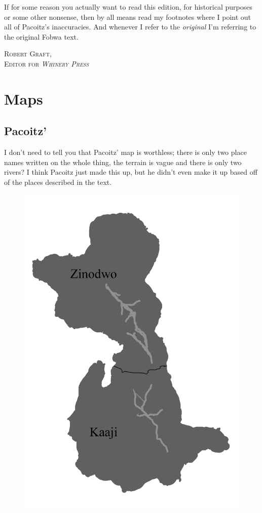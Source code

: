 If for some reason you actually want to read this edition, for historical purposes or some other nonsense, then by all means read my footnotes where I point out all of Pa\-co\-itz's inaccuracies. And whenever I refer to the \emph{original} I'm referring to the original Fo\-bwa text.
\begin{flushright}
\textsc{
Robert Graft,\\
Editor for \emph{Whinery Press}}
\end{flushright}

\chapter{Maps}
\section{Pa\-co\-itz'}
I don't need to tell you that Pa\-co\-itz' map is worthless; there is only two place names written on the whole thing, the terrain is vague and there is only two rivers? I think Pa\-co\-itz just made this up, but he didn't even make it up based off of the places described in the text.
\begin{figure}
\centering
\includegraphics[width=4.5in]{Twizwa_map2.png}
\end{figure}
\clearpage

